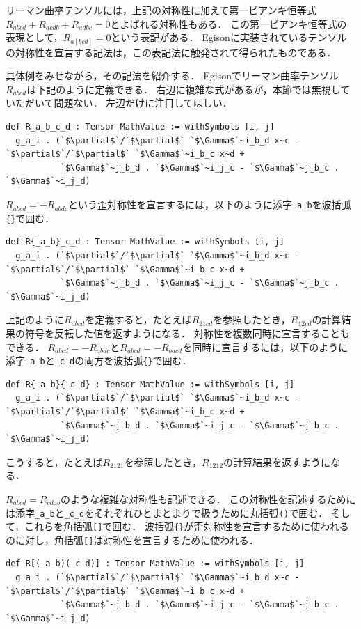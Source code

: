 リーマン曲率テンソルには，上記の対称性に加えて第一ビアンキ恒等式$R_{abcd} + R_{acdb} + R_{adbc} = 0$とよばれる対称性もある．
この第一ビアンキ恒等式の表現として，$R_{a[bcd]} = 0$という表記がある．
Egisonに実装されているテンソルの対称性を宣言する記法は，この表記法に触発されて得られたものである．

具体例をみせながら，その記法を紹介する．
Egisonでリーマン曲率テンソル$R_{abcd}$は下記のように定義できる．
右辺に複雑な式があるが，本節では無視していただいて問題ない．
左辺だけに注目してほしい．
\begin{lstlisting}[language=egison,numbers=none]
def R_a_b_c_d : Tensor MathValue := withSymbols [i, j]
  g_a_i . (`$\partial$`/`$\partial$` `$\Gamma$`~i_b_d x~c - `$\partial$`/`$\partial$` `$\Gamma$`~i_b_c x~d +
           `$\Gamma$`~j_b_d . `$\Gamma$`~i_j_c - `$\Gamma$`~j_b_c . `$\Gamma$`~i_j_d)
\end{lstlisting}
$R_{abcd} = -R_{abdc}$という歪対称性を宣言するには，以下のように添字\lstinline{_a_b}を波括弧\lstinline|{}|で囲む．
\begin{lstlisting}[language=egison,numbers=none]
def R{_a_b}_c_d : Tensor MathValue := withSymbols [i, j]
  g_a_i . (`$\partial$`/`$\partial$` `$\Gamma$`~i_b_d x~c - `$\partial$`/`$\partial$` `$\Gamma$`~i_b_c x~d +
           `$\Gamma$`~j_b_d . `$\Gamma$`~i_j_c - `$\Gamma$`~j_b_c . `$\Gamma$`~i_j_d)
\end{lstlisting}
上記のように$R_{abcd}$を定義すると，たとえば$R_{21cd}$を参照したとき，$R_{12cd}$の計算結果の符号を反転した値を返すようになる．
対称性を複数同時に宣言することもできる．
$R_{abcd} = -R_{abdc}$と$R_{abcd} = -R_{bacd}$を同時に宣言するには，以下のように添字\lstinline{_a_b}と\lstinline{_c_d}の両方を波括弧\lstinline|{}|で囲む．
\begin{lstlisting}[language=egison,numbers=none]
def R{_a_b}{_c_d} : Tensor MathValue := withSymbols [i, j]
  g_a_i . (`$\partial$`/`$\partial$` `$\Gamma$`~i_b_d x~c - `$\partial$`/`$\partial$` `$\Gamma$`~i_b_c x~d +
           `$\Gamma$`~j_b_d . `$\Gamma$`~i_j_c - `$\Gamma$`~j_b_c . `$\Gamma$`~i_j_d)
\end{lstlisting}
こうすると，たとえば$R_{2121}$を参照したとき，$R_{1212}$の計算結果を返すようになる．

$R_{abcd} = R_{cdab}$のような複雑な対称性も記述できる．
この対称性を記述するためには添字\lstinline{_a_b}と\lstinline{_c_d}をそれぞれひとまとまりで扱うために丸括弧\lstinline{()}で囲む．
そして，これらを角括弧\lstinline|[]|で囲む．
波括弧\lstinline|{}|が歪対称性を宣言するために使われるのに対し，角括弧\lstinline|[]|は対称性を宣言するために使われる．
\begin{lstlisting}[language=egison,numbers=none]
def R[(_a_b)(_c_d)] : Tensor MathValue := withSymbols [i, j]
  g_a_i . (`$\partial$`/`$\partial$` `$\Gamma$`~i_b_d x~c - `$\partial$`/`$\partial$` `$\Gamma$`~i_b_c x~d +
           `$\Gamma$`~j_b_d . `$\Gamma$`~i_j_c - `$\Gamma$`~j_b_c . `$\Gamma$`~i_j_d)
\end{lstlisting}

